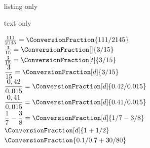 \begin{PresCodeTexPL}{listing only}
\end{PresCodeTexPL}

\begin{PresCodeSortiePL}{text only}

\smallskip


\smallskip


\smallskip


\smallskip


\smallskip


\smallskip


\smallskip

\end{PresCodeSortiePL}

\begin{PresCodePL}{}
$\frac{111}{2145}=\ConversionFraction{111/2145}$ \\

$\frac{3}{15}=\ConversionFraction[]{3/15}$ \\

$\tfrac{3}{15}=\ConversionFraction[t]{3/15}$ \\

$\dfrac{3}{15}=\ConversionFraction[d]{3/15}$ \\

$\dfrac{0,42}{0,015}=\ConversionFraction[d]{0.42/0.015}$ \\

$\dfrac{0,41}{0,015}=\ConversionFraction[d]{0.41/0.015}$ \\

$\dfrac{1}{7}-\dfrac{3}{8}=\ConversionFraction[d]{1/7-3/8}$ \\

$\ConversionFraction[d]{1+1/2}$ \\

$\ConversionFraction{0.1/0.7+30/80}$
\end{PresCodePL}

